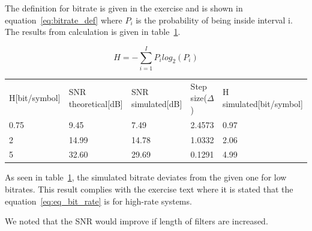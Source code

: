 	The definition for bitrate is given in the exercise and is shown in equation~\ref{eq:bitrate_def} where $P_i$ is the probability of being inside interval i. The results from calculation is given in table~\ref{tab:result_SNR_H}.
	
	\begin{equation}
		H=-\sum\limits_{i=1}^{I}P_ilog_2(P_i)
		\label{eq:bitrate_def}            
	\end{equation}
	
	\begin{table}[h]
		\centering
		\begin{tabular}{l l l l l}
			H[bit/symbol] & SNR theoretical[dB] & SNR simulated[dB] & Step size($\Delta$) & H simulated[bit/symbol]\\
			0.75 & 9.45 & 7.49 & 2.4573 & 0.97 \\
			2 & 14.99 & 14.78 & 1.0332 & 2.06\\
			5 & 32.60 & 29.69 & 0.1291 & 4.99\\
		\end{tabular}
		\label{tab:result_SNR_H}
	\end{table}
	
	As seen in table~\ref{tab:result_SNR_H}, the simulated bitrate deviates from the given one for low bitrates. This result complies with the exercise text where it is stated that the equation~\ref{eq:eq_bit_rate} is for high-rate systems. 
	
	We noted that the SNR would improve if length of filters are increased.